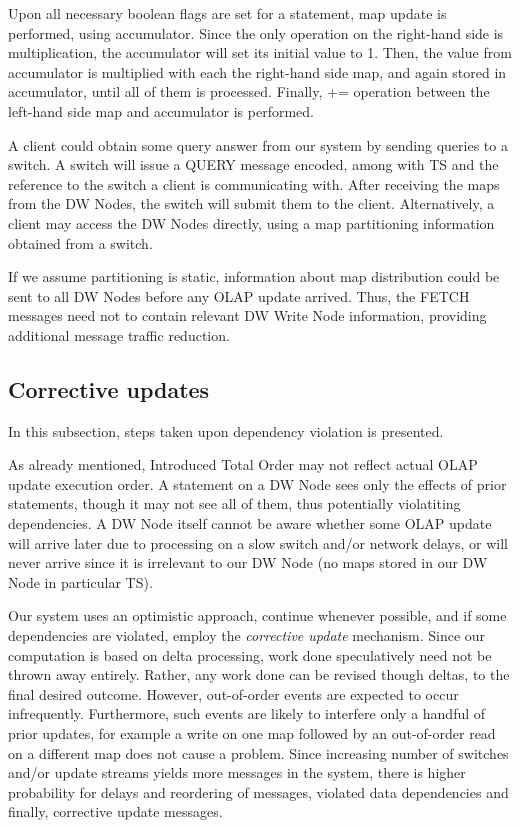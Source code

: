 \documentclass{sig-semester}
\def\OLAP{OLAP\xspace}
\def\EXORD{actual OLAP update execution order\xspace}
\begin{document}
Upon all necessary boolean flags are set for a statement, map update is performed, using accumulator. Since the only operation on the right-hand side is multiplication, the accumulator will set its initial value to 1. Then, the value from accumulator is multiplied with each the right-hand side map, and again stored in accumulator, until all of them is processed. Finally, += operation between the left-hand side map and accumulator is performed.

A client could obtain some query answer from our system by sending queries to a switch. A switch will issue a QUERY message encoded, among with TS and the reference to the switch a client is communicating with. After receiving the maps from the DW Nodes, the switch will submit them to the client. Alternatively, a client may access the DW Nodes directly, using a map partitioning information obtained from a switch.

If we assume partitioning is static, information about map distribution could be sent to all DW Nodes before any \OLAP update arrived. Thus, the FETCH messages need not to contain relevant DW Write Node information, providing additional message traffic reduction.

\subsection{Corrective updates}
\label{Corrective}
In this subsection, steps taken upon dependency violation is presented. 

As already mentioned, Introduced Total Order may not reflect \EXORD. A statement on a DW Node sees only the effects of prior statements, though it may not see all of them, thus potentially violatiting dependencies. A DW Node itself cannot be aware whether some \OLAP update will arrive later due to processing on a slow switch and/or network delays, or will never arrive since it is irrelevant to our DW Node (no maps stored in our DW Node in particular TS).

Our system uses an optimistic approach, continue whenever possible, and if some dependencies are violated, employ the \textit{corrective update} mechanism. Since our computation is based on delta processing, work done speculatively need not be thrown away entirely. Rather, any work done can be revised though deltas, to the final desired outcome. However, out-of-order events are expected to occur infrequently. Furthermore, such events are likely to interfere only a handful of prior updates, for example a write on one map followed by an out-of-order read on a different map does not cause a problem. Since increasing number of switches and/or update streams yields more messages in the system, there is higher probability for delays and reordering of messages, violated data dependencies and finally, corrective update messages.
\end{document}
